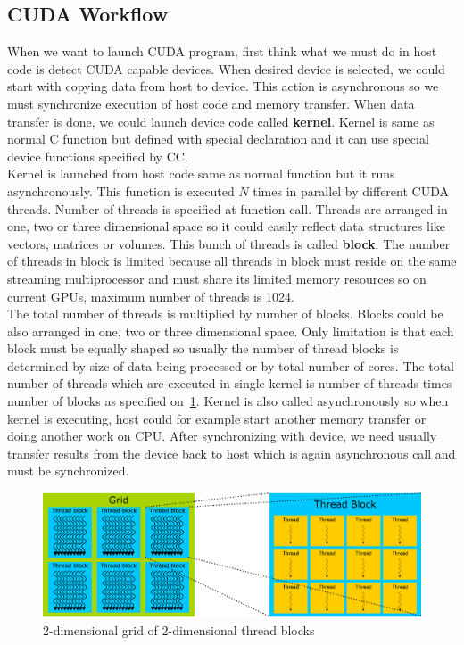\subsection{CUDA Workflow}
When we want to launch CUDA program, first think what we must do in host code is detect CUDA capable devices. When desired device is selected, we could start with copying data from host to device. This action is asynchronous so we must synchronize execution of host code and memory transfer. When data transfer is done, we could launch device code called \textbf{kernel}. Kernel is same as normal C function but defined with special declaration and it can use special device functions specified by CC. \\
Kernel is launched from host code same as normal function but it runs asynchronously. This function is executed $N$ times in parallel by different CUDA threads. Number of threads is specified at function call. Threads are arranged in one, two or three dimensional space so it could easily reflect data structures like vectors, matrices or volumes. This bunch of threads is called \textbf{block}. The number of threads in block is limited because all threads in block must reside on the same streaming multiprocessor and must share its limited memory resources so on current GPUs, maximum number of threads is 1024.\\
The total number of threads is multiplied by number of blocks. Blocks could be also arranged in one, two or three dimensional space. Only limitation is that each block must be equally shaped so usually the number of thread blocks is determined by size of data being processed or by total number of cores. The total number of threads which are executed in single kernel is number of threads times number of blocks as specified on~\ref{fig:cudagridthreadblock}. Kernel is also called asynchronously so when kernel is executing, host could for example start another memory transfer or doing another work on CPU. After synchronizing with device, we need usually transfer results from the device back to host which is again asynchronous call and must be synchronized.

\begin{figure}[h]
  \centering
  \includegraphics[width=1\linewidth]{img/CUDAthreadGridBlock.eps}
  \caption{2-dimensional grid of 2-dimensional thread blocks}
  \label{fig:cudagridthreadblock}
\end{figure}

